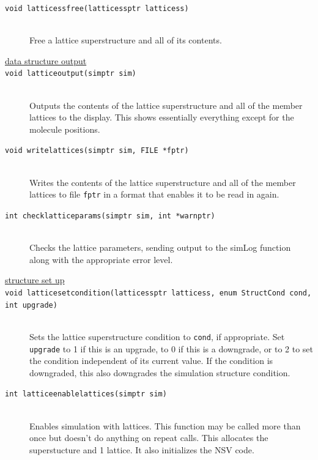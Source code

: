 \documentclass {scrbook}
\newcommand {\ttt} {\texttt}
\begin{document}
\begin{description}
\item[\ttt{void latticessfree(latticessptr latticess)}]
\hfill \\
Free a lattice superstructure and all of its contents.

\item[\underline{data structure output}]

\item[\ttt{void latticeoutput(simptr sim)}]
\hfill \\
Outputs the contents of the lattice superstructure and all of the member lattices to the display. This shows essentially everything except for the molecule positions.

\item[\ttt{void writelattices(simptr sim, FILE *fptr)}]
\hfill \\
Writes the contents of the lattice superstructure and all of the member lattices to file \ttt{fptr} in a format that enables it to be read in again.

\item[\ttt{int checklatticeparams(simptr sim, int *warnptr)}]
\hfill \\
Checks the lattice parameters, sending output to the simLog function along with the appropriate error level.

\item[\underline{structure set up}]

\item[\ttt{void latticesetcondition(latticessptr latticess, enum StructCond cond, int upgrade)}]
\hfill \\
Sets the lattice superstructure condition to \ttt{cond}, if appropriate. Set \ttt{upgrade} to 1 if this is an upgrade, to 0 if this is a downgrade, or to 2 to set the condition independent of its current value. If the condition is downgraded, this also downgrades the simulation structure condition.

\item[\ttt{int latticeenablelattices(simptr sim)}]
\hfill \\
Enables simulation with lattices. This function may be called more than once but doesn't do anything on repeat calls. This allocates the superstucture and 1 lattice. It also initializes the NSV code.


\end{description}
\end{document}
